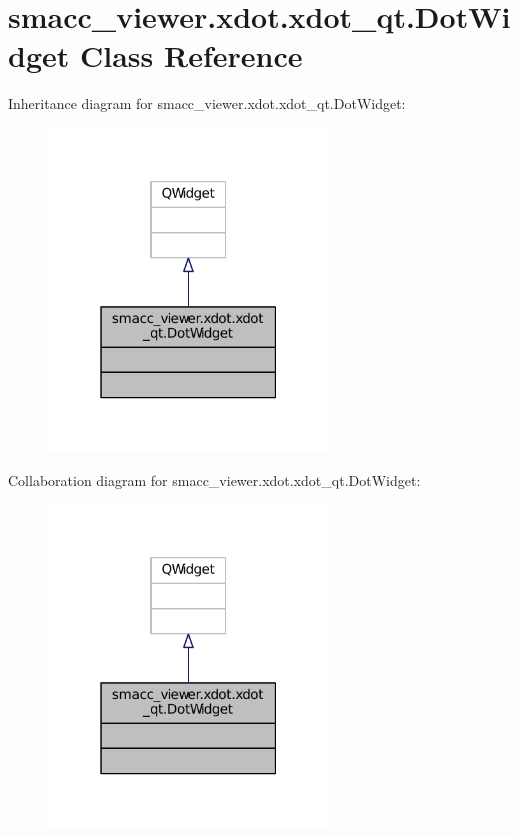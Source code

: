 \hypertarget{classsmacc__viewer_1_1xdot_1_1xdot__qt_1_1DotWidget}{}\section{smacc\+\_\+viewer.\+xdot.\+xdot\+\_\+qt.\+Dot\+Widget Class Reference}
\label{classsmacc__viewer_1_1xdot_1_1xdot__qt_1_1DotWidget}


Inheritance diagram for smacc\+\_\+viewer.\+xdot.\+xdot\+\_\+qt.\+Dot\+Widget\+:
\nopagebreak
\begin{figure}[H]
\begin{center}
\leavevmode
\includegraphics[width=211pt]{classsmacc__viewer_1_1xdot_1_1xdot__qt_1_1DotWidget__inherit__graph}
\end{center}
\end{figure}


Collaboration diagram for smacc\+\_\+viewer.\+xdot.\+xdot\+\_\+qt.\+Dot\+Widget\+:
\nopagebreak
\begin{figure}[H]
\begin{center}
\leavevmode
\includegraphics[width=211pt]{classsmacc__viewer_1_1xdot_1_1xdot__qt_1_1DotWidget__coll__graph}
\end{center}
\end{figure}


